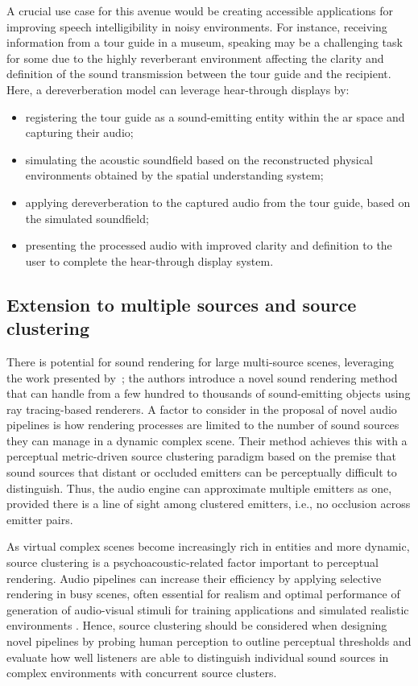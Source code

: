 A crucial use case for this avenue would be creating accessible applications for improving speech intelligibility in noisy environments. For instance, receiving information from a tour guide in a museum, speaking may be a challenging task for some due to the highly reverberant environment affecting the clarity and definition of the sound transmission between the tour guide and the recipient. Here, a dereverberation model can leverage hear-through displays by:
\begin{itemize}
    \item registering the tour guide as a sound-emitting entity within the \acrshort{ar} space and capturing their audio;
    \item simulating the acoustic soundfield based on the reconstructed physical environments obtained by the spatial understanding system;
    \item applying dereverberation to the captured audio from the tour guide, based on the simulated soundfield;
    \item presenting the processed audio with improved clarity and definition to the user to complete the hear-through display system.
\end{itemize}

\subsection{Extension to multiple sources and source clustering}
There is potential for sound rendering for large multi-source scenes, leveraging the work presented by~\cite{schissler2016interactive}; the authors introduce a novel sound rendering method that can handle from a few hundred to thousands of sound-emitting objects using ray tracing-based renderers. A factor to consider in the proposal of novel audio pipelines is how rendering processes are limited to the number of sound sources they can manage in a dynamic complex scene. Their method achieves this with a perceptual metric-driven source clustering paradigm based on the premise that sound sources that distant or occluded emitters can be perceptually difficult to distinguish. Thus, the audio engine can approximate multiple emitters as one, provided there is a line of sight among clustered emitters, i.e., no occlusion across emitter pairs.\par
As virtual complex scenes become increasingly rich in entities and more dynamic, source clustering is a psychoacoustic-related factor important to perceptual rendering. Audio pipelines can increase their efficiency by applying selective rendering in busy scenes, often essential for realism and optimal performance of generation of audio-visual stimuli for training applications and simulated realistic environments \citep{Woodward2021}. Hence, source clustering should be considered when designing novel pipelines by probing human perception to outline perceptual thresholds and evaluate how well listeners are able to distinguish individual sound sources in complex environments with concurrent source clusters.\par

